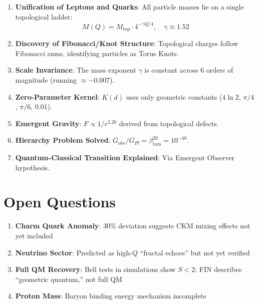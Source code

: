 \documentclass[11pt, a4paper]{article}
\theoremstyle{remark}
\newcommand{\Kd}{K(d)}
\newcommand{\betators}{\beta_{\text{tors}}}
\newcommand{\Mtop}{M_{\text{top}}}
\begin{document}
\begin{enumerate}
    \item \textbf{Unification of Leptons and Quarks}: All particle masses lie on a single topological ladder:
    \begin{equation}
    M(Q) = \Mtop \cdot 4^{-\gamma Q/4}, \quad \gamma \approx 1.52
    \end{equation}
    
    \item \textbf{Discovery of Fibonacci/Knot Structure}: Topological charges follow Fibonacci sums, identifying particles as Torus Knots.
    
    \item \textbf{Scale Invariance}: The mass exponent $\gamma$ is constant across 6 orders of magnitude (running $\approx -0.007$).
    
    \item \textbf{Zero-Parameter Kernel}: $\Kd$ uses only geometric constants ($4\ln 2$, $\pi/4$, $\pi/6$, $0.01$).
    
    \item \textbf{Emergent Gravity}: $F \propto 1/r^{2.26}$ derived from topological defects.
    
    \item \textbf{Hierarchy Problem Solved}: $G_{obs}/G_{Pl} = \betators^{20} = 10^{-40}$.
    
    \item \textbf{Quantum-Classical Transition Explained}: Via Emergent Observer hypothesis.
\end{enumerate}

\section{Open Questions}

\begin{enumerate}
    \item \textbf{Charm Quark Anomaly}: 30\% deviation suggests CKM mixing effects not yet included
    
    \item \textbf{Neutrino Sector}: Predicted as high-$Q$ ``fractal echoes'' but not yet verified
    
    \item \textbf{Full QM Recovery}: Bell tests in simulations show $S < 2$; FIN describes ``geometric quantum,'' not full QM
    
    \item \textbf{Proton Mass}: Baryon binding energy mechanism incomplete
\end{enumerate}
\end{document}
